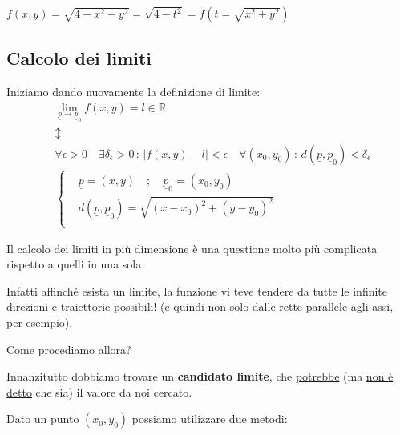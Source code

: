  $f(x,y)=\sqrt{4-x^2-y^2} = \sqrt{4-t^2}=f(t=\sqrt{x^2 + y^2})$
 
\newpage
 
\subsection{Calcolo dei limiti}
 
 Iniziamo dando nuovamente la definizione di limite:
  \begin{align}
 {}&\underset{\underline{p}\rightarrow \underline{p}_0}{\lim} f(x,y)=l\in \mathbb{R} \\ 
 &\updownarrow \nonumber\\
 &\forall \epsilon >0 \quad \exists \delta_\epsilon>0 \, : \, |f(x,y)-l|<\epsilon \quad \forall (x_0,y_0) \, : \, d(\underline{p},\underline{p}_0)<\delta_\epsilon \\
 &\left\{
 \begin{array}{cc}
 &\underline{p}=(x,y) \quad ; \quad \underline{p}_0=(x_0,y_0) \\
 &d(\underline{p},\underline{p}_0)=\sqrt{(x-x_0)^2 + (y-y_0)^2}\\
 \end{array} 
 \right.
 \end{align}
 
 Il calcolo dei limiti in più dimensione è una questione molto più complicata rispetto a quelli in una sola. 
 
 Infatti affinché esista un limite, la funzione vi teve tendere da tutte le infinite direzioni e traiettorie possibili! (e quindi non solo dalle rette parallele agli assi, per esempio).
 
 Come procediamo allora?
 
 Innanzitutto dobbiamo trovare un \textbf{candidato limite}, che \underline{potrebbe} (ma \underline{non è detto} che sia) il valore da noi cercato.
 
  Dato un punto $(x_0,y_0)$ possiamo utilizzare due metodi:
 
